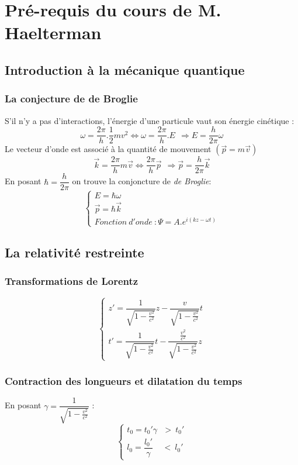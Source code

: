 \documentclass	[11pt, a4paper, openany]{book}
\begin{document}
\chapter*{Pré-requis du cours de M. Haelterman}
\section*{Introduction à la mécanique quantique}
\subsection*{La conjecture de de Broglie}
S'il n'y a pas d'interactions, l'énergie d'une particule vaut son énergie cinétique :
$$\omega = \frac{2\pi}{h}.\frac{1}{2}mv^2 \Leftrightarrow \omega = \frac{2\pi}{h}.E\ \ \Rightarrow E = \frac{h}{2\pi}\omega$$
Le vecteur d'onde est associé à la quantité de mouvement $(\vec{p} = m\vec v)$
$$\vec{k} = \frac{2\pi}{h}m\vec{v} \Leftrightarrow \frac{2\pi}{h}\vec{p} \ \ \Rightarrow \vec{p} = \frac{h}{2\pi}\vec{k}$$
En posant $\hbar = \dfrac{h}{2\pi}$ on trouve la conjoncture de \textit{de Broglie}:
$$\left\{\begin{array}{l}
E = \hbar \omega\\
\vec{p} =  \hbar \vec{k}\\
Fonction\ d'onde\ : \Psi = A.e^{i(kz - \omega t)}
\end{array}\right.$$

\section*{La relativité restreinte}
\subsection*{Transformations de Lorentz}
$$\left\{\begin{array}{l}
z' = \dfrac{1}{\sqrt{1 - \frac{v^2}{c^2}}}z - \dfrac{v}{\sqrt{1 - \frac{v^2}{c^2}}}t\\
t' = \dfrac{1}{\sqrt{1 - \frac{v^2}{c^2}}}t - \dfrac{\frac{v^2}{c^2}}{\sqrt{1 - \frac{v^2}{c^2}}}z
\end{array}\right.$$

\subsection*{Contraction des longueurs et dilatation du temps}
En posant $\gamma = \dfrac{1}{\sqrt{1 - \frac{v^2}{c^2}}}$ :
$$\left\{\begin{array}{l}
t_0 = t_0' \gamma\ \ \ >\ t_0'\\
l_0 = \dfrac{l_0'}{\gamma}\ \ \ \ \ <\ l_0'
\end{array}\right.$$
\end{document}
